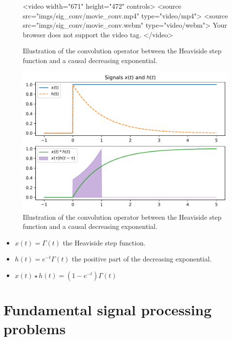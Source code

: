 \begin{warpHTML}
  \begin{figure}[ht]
    \centering
    <video width="671" height="472" controls>
    <source src="imgs/sig\_conv/movie\_conv.mp4" type="video/mp4">
    <source src="imgs/sig\_conv/movie\_conv.webm" type="video/webm">
    Your browser does not support the video tag.
    </video>   
    \caption{Illustration of the convolution operator between the Heaviside step function and a causal decreasing exponential.}
    \label{fig:convolution}
  \end{figure}
\end{warpHTML}
\begin{warpprint}
  \begin{figure}[ht]
    \centering
    \includegraphics[width=.7\linewidth]{imgs/sig_conv/signals_conv}
    \caption{Illustration of the convolution operator between the Heaviside step function and a causal decreasing exponential.}
    \label{fig:convolution}
  \end{figure}
\end{warpprint}



\begin{itemize}
\item $x(t)=\Gamma(t)$ the Heaviside step function.
\item $h(t)=e^{-t}\Gamma(t)$ the positive part of the decreasing exponential.
\item $x(t)\star h(t)=(1-e^{-t})\Gamma(t)$
\end{itemize}


\section{Fundamental signal processing problems}
\label{sec:sp_prob}

